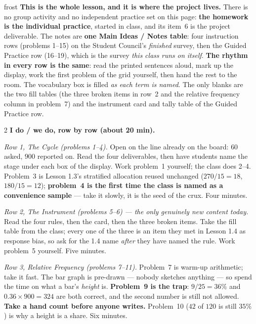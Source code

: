 \documentclass[10pt]{article}
\begin{document}
\boxguard
\begin{skillbox}{frost}
\textbf{This is the whole lesson, and it is where the project lives.} There is no group activity
and no independent practice set on this page: \textbf{the homework is the individual practice},
started in class, and its item~6 is the project deliverable. The notes are \textbf{one Main Ideas
/ Notes table}: four instruction rows (problems 1--15) on the Student Council's \emph{finished}
survey, then the Guided Practice row (16--19), which is the survey \emph{this class runs on
itself}. \textbf{The rhythm in every row is the same}: read the printed sentences aloud, mark up
the display, work the first problem of the grid yourself, then hand the rest to the room. The
vocabulary box is filled \emph{as each term is named}. The only blanks are the two fill tables
(the three broken items in row~2 and the relative frequency column in problem~7) and the
instrument card and tally table of the Guided Practice row.
\begin{multicols}{2}
\textbf{I do / we do, row by row (about 20 min).}

\emph{Row 1, The Cycle (problems 1--4).} Open on the line already on the board: $60$ asked, $900$
reported on. Read the four deliverables, then have students name the stage under each box of the
display. Work problem~1 yourself; the class does 2--4. Problem~3 is Lesson 1.3's stratified
allocation reused unchanged ($270/15 = 18$, $180/15 = 12$); \textbf{problem~4 is the first time
the class is named as a convenience sample} --- take it slowly, it is the seed of the crux.
Four minutes.

\emph{Row 2, The Instrument (problems 5--6) --- the only genuinely new content today.} Read the
four rules, then the card, then the three broken items. Take the fill table from the class; every
one of the three is an item they met in Lesson 1.4 as response bias, so ask for the 1.4 name
\emph{after} they have named the rule. Work problem~5 yourself. Five minutes.

\emph{Row 3, Relative Frequency (problems 7--11).} Problem~7 is warm-up arithmetic; take it fast.
The bar graph is pre-drawn --- nobody sketches anything --- so spend the time on what a bar's
\emph{height} is. \textbf{Problem~9 is the trap}: $9/25 = 36\%$ and $0.36 \times 900 = 324$ are
both correct, and the second number is still not allowed. \textbf{Take a hand count before anyone
writes.} Problem~10 ($42$ of $120$ is still $35\%$) is why a height is a share. Six minutes.


\end{multicols}
\end{skillbox}
\end{document}
